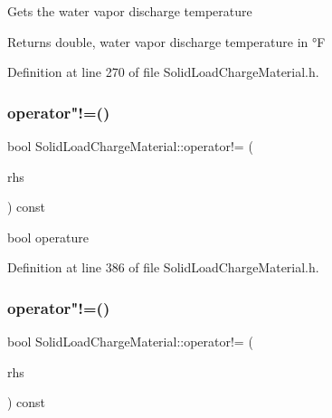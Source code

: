 Gets the water vapor discharge temperature \begin{DoxyReturn}{Returns}
double, water vapor discharge temperature in °F 
\end{DoxyReturn}


Definition at line 270 of file Solid\+Load\+Charge\+Material.\+h.

\mbox{\label{class_solid_load_charge_material_abb07f23a4dc3bfacabd2080b14034248}} 
\subsubsection{\texorpdfstring{operator"!=()}{operator!=()}\hspace{0.1cm}{\footnotesize\ttfamily [1/3]}}
{\footnotesize\ttfamily bool Solid\+Load\+Charge\+Material\+::operator!= (\begin{DoxyParamCaption}\item[{const \hyperlink{class_solid_load_charge_material}{Solid\+Load\+Charge\+Material} \&}]{rhs }\end{DoxyParamCaption}) const\hspace{0.3cm}{\ttfamily [inline]}}

bool operature 

Definition at line 386 of file Solid\+Load\+Charge\+Material.\+h.

\mbox{\label{class_solid_load_charge_material_abb07f23a4dc3bfacabd2080b14034248}} 
\subsubsection{\texorpdfstring{operator"!=()}{operator!=()}\hspace{0.1cm}{\footnotesize\ttfamily [2/3]}}
{\footnotesize\ttfamily bool Solid\+Load\+Charge\+Material\+::operator!= (\begin{DoxyParamCaption}\item[{const \hyperlink{class_solid_load_charge_material}{Solid\+Load\+Charge\+Material} \&}]{rhs }\end{DoxyParamCaption}) const\hspace{0.3cm}{\ttfamily [inline]}}

